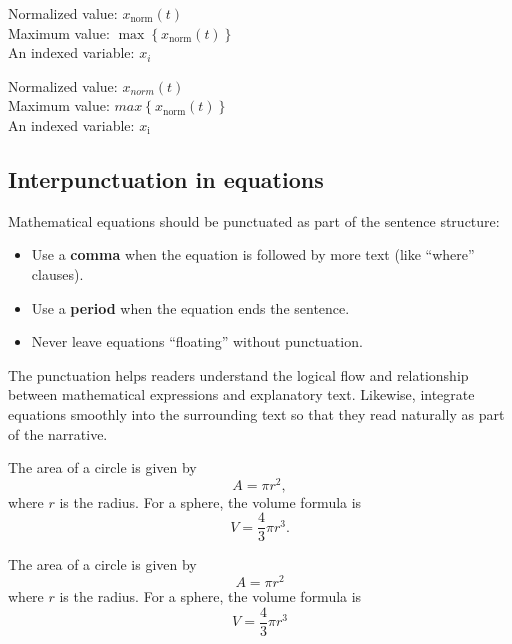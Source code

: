 \begin{successbox}[title={Correct formatting}]
	Normalized value: $x_\mathrm{norm}(t)$ \\
	Maximum value: $\max\left\{x_\mathrm{norm}(t)\right\}$ \\
	An indexed variable: $x_i$
\end{successbox}%

\begin{errorbox}[title={Incorrect formatting}]
	Normalized value: $x_{norm}(t)$ \\
	Maximum value: $max \left\{x_{\mathrm{norm}}(t) \right\}$\\
	An indexed variable: $x_{\mathrm{i}}$
\end{errorbox}

\subsection{Interpunctuation in equations}
\label{subsec:interpunctuation}
\begin{infobox}[title={Punctuation rules}]
	Mathematical equations should be punctuated as part of the sentence structure:

	\begin{itemize}
		\item Use a \textbf{comma} when the equation is followed by more text (like \enquote{where} clauses).
		\item Use a \textbf{period} when the equation ends the sentence.
		\item Never leave equations \enquote{floating} without punctuation.
	\end{itemize}

	The punctuation helps readers understand the logical flow and relationship between mathematical expressions and explanatory text. Likewise, integrate equations smoothly into the surrounding text so that they read naturally as part of the narrative.
\end{infobox}
%
\begin{successbox}[title={Correct punctuation}]
	The area of a circle is given by
	\begin{equation}
		A = \pi r^2,
	\end{equation}
	where $r$ is the radius. For a sphere, the volume formula is
	\begin{equation}
		V = \frac{4}{3}\pi r^3.
	\end{equation}
\end{successbox}
%
\begin{errorbox}[title={Missing punctuation}]
	The area of a circle is given by
	\begin{equation}
		A = \pi r^2
	\end{equation}
	where $r$ is the radius. For a sphere, the volume formula is
	\begin{equation}
		V = \frac{4}{3}\pi r^3
	\end{equation}
\end{errorbox}

